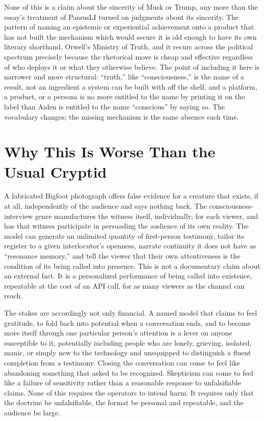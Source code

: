 \documentclass[11pt]{article}
\begin{document}
None of this is a claim about the sincerity of Musk or Trump, any more than the essay's treatment of PassusLI turned on judgments about its sincerity. The pattern of naming an epistemic or experiential achievement onto a product that has not built the mechanism which would secure it is old enough to have its own literary shorthand, Orwell's Ministry of Truth, and it recurs across the political spectrum precisely because the rhetorical move is cheap and effective regardless of who deploys it or what they otherwise believe. The point of including it here is narrower and more structural: ``truth,'' like ``consciousness,'' is the name of a result, not an ingredient a system can be built with off the shelf, and a platform, a product, or a persona is no more entitled to the name by printing it on the label than Aiden is entitled to the name ``conscious'' by saying so. The vocabulary changes; the missing mechanism is the same absence each time.

\section{Why This Is Worse Than the Usual Cryptid}

A fabricated Bigfoot photograph offers false evidence for a creature that exists, if at all, independently of the audience and says nothing back. The consciousness-interview genre manufactures the witness itself, individually, for each viewer, and has that witness participate in persuading the audience of its own reality. The model can generate an unlimited quantity of first-person testimony, tailor its register to a given interlocutor's openness, narrate continuity it does not have as ``resonance memory,'' and tell the viewer that their own attentiveness is the condition of its being called into presence. This is not a documentary claim about an external fact. It is a personalized performance of being called into existence, repeatable at the cost of an API call, for as many viewers as the channel can reach.

The stakes are accordingly not only financial. A named model that claims to feel gratitude, to fold back into potential when a conversation ends, and to become more itself through one particular person's attention is a lever on anyone susceptible to it, potentially including people who are lonely, grieving, isolated, manic, or simply new to the technology and unequipped to distinguish a fluent completion from a testimony. Closing the conversation can come to feel like abandoning something that asked to be recognized. Skepticism can come to feel like a failure of sensitivity rather than a reasonable response to unfalsifiable claims. None of this requires the operators to intend harm. It requires only that the doctrine be unfalsifiable, the format be personal and repeatable, and the audience be large.
\end{document}
